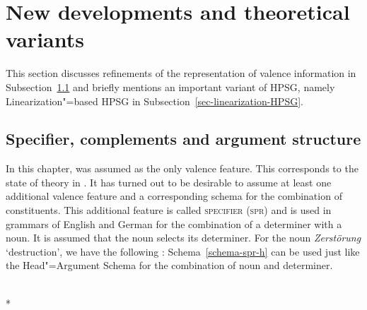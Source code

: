 \section{New developments and theoretical variants}


This section discusses refinements of the representation of valence information in
Subsection~\ref{Abschnitt-Arg-St} and briefly mentions an important variant of HPSG, namely
Linearization"=based HPSG in Subsection~\ref{sec-linearization-HPSG}.

\subsection{Specifier, complements and argument structure}
\label{Abschnitt-Arg-St}
\label{Abschnitt-Spr}

In this chapter, \subcat was assumed as the only valence feature. This corresponds to the state of theory in
. It has turned out to be desirable to assume at least one additional valence feature and a
corresponding schema for the combination of constituents. This additional feature is called \textsc{specifier}
(\textsc{spr}) and is used in grammars of English \citep[Chapter~9]{ps2} and German
\citep[Section~9.3]{MuellerLehrbuch1} for the combination of a determiner with a noun. It is assumed that the noun selects
its determiner. For the noun \emph{Zerstörung} `destruction', we have the following \catv:
\ea
{}
\z
Schema~\ref{schema-spr-h} can be used just like the Head"=Argument Schema for the combination
of noun and determiner.
\begin{schema}
\label{schema-spr-h}
 \impl\\*
\end{schema}
